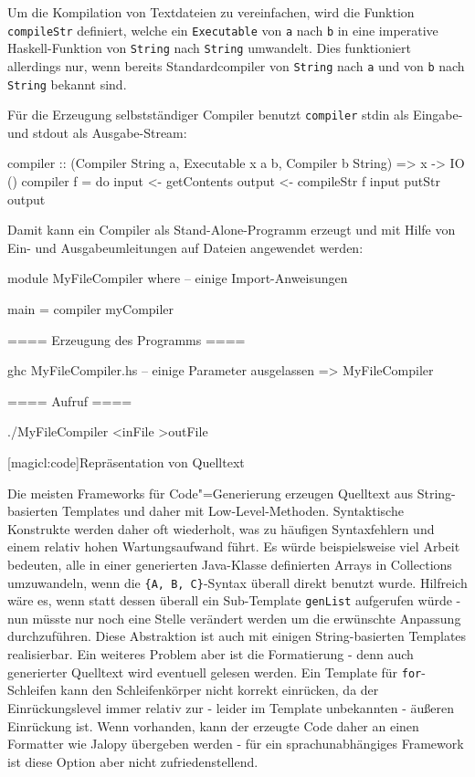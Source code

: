 \documentclass[11pt, a4paper, bibgerm]{scrbook}
\newcommand\icode[1]{\lstinline?#1?}
\newcommand\lsection{}
\newcommand{\cgen}{Code"=Generierung}
\begin{document}
Um die Kompilation von Textdateien zu vereinfachen, wird die Funktion
\icode{compileStr} definiert, welche ein \icode{Executable} von
\icode{a} nach \icode{b} in eine imperative Haskell-Funktion von
\icode{String} nach \icode{String} umwandelt. Dies funktioniert
allerdings nur, wenn bereits Standardcompiler von \icode{String} nach
\icode{a} und von \icode{b} nach \icode{String} bekannt sind.
Für die Erzeugung selbstständiger Compiler benutzt \icode{compiler}
stdin als Eingabe- und stdout als Ausgabe-Stream:
\begin{code}
compiler :: (Compiler String a, Executable x a b, Compiler b String) => x -> IO ()
compiler f = do
  input <- getContents
  output <- compileStr f input
  putStr output  
\end{code}
Damit kann ein Compiler als Stand-Alone-Programm erzeugt und mit Hilfe
von Ein- und Ausgabeumleitungen auf Dateien angewendet werden:
\begin{code}
module MyFileCompiler where
-- einige Import-Anweisungen

main = compiler myCompiler

==== Erzeugung des Programms ====

ghc MyFileCompiler.hs  -- einige Parameter ausgelassen
=> MyFileCompiler

==== Aufruf ====

./MyFileCompiler <inFile >outFile
\end{code}

\lsection[magicl:code]{Repräsentation von Quelltext}

Die meisten Frameworks für \cgen{} erzeugen Quelltext aus
String-basierten Templates und daher mit
Low-Level-Methoden. Syntaktische Konstrukte werden daher oft wiederholt,
was zu häufigen Syntaxfehlern und einem relativ hohen Wartungsaufwand
führt. Es würde beispielsweise viel Arbeit bedeuten, alle in einer
generierten Java-Klasse definierten Arrays in Collections umzuwandeln,
wenn die \icode{{A, B, C}}-Syntax überall direkt benutzt
wurde. Hilfreich wäre es, wenn statt dessen überall ein Sub-Template
\icode{genList} aufgerufen würde - nun müsste nur noch eine Stelle
verändert werden um die erwünschte Anpassung durchzuführen. Diese
Abstraktion ist auch mit einigen String-basierten Templates
realisierbar. Ein weiteres Problem aber ist die Formatierung - denn auch
generierter Quelltext wird eventuell gelesen werden. Ein Template für
\icode{for}-Schleifen kann den Schleifenkörper nicht korrekt einrücken,
da der Einrückungslevel immer relativ zur - leider im Template
unbekannten - äußeren Einrückung ist.  Wenn vorhanden, kann der erzeugte
Code daher an einen Formatter wie Jalopy\cite{Jalopy} übergeben werden -
für ein sprachunabhängiges Framework ist diese Option aber nicht
zufriedenstellend.
\end{document}
